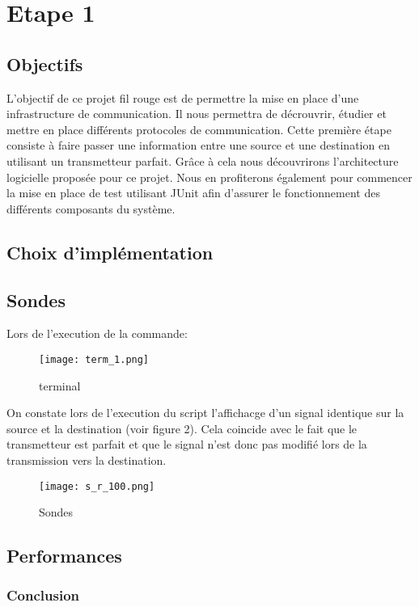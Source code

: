 \section{Etape 1}
\subsection{Objectifs}

L'objectif de ce projet fil rouge est de permettre la mise en place d'une infrastructure de communication.
Il nous permettra de décrouvrir, étudier et mettre en place différents protocoles de communication. Cette première étape 
consiste à faire passer une information entre une source et une destination en utilisant
un transmetteur parfait. Grâce à cela nous découvrirons l'architecture logicielle proposée pour ce projet. Nous en profiterons également
pour commencer la mise en place de test utilisant JUnit afin d'assurer le fonctionnement des différents composants du système.

\subsection{Choix d'implémentation}

\pagebreak

\subsection{Sondes}

Lors de l'execution de la commande: 

\begin{figure}[h]
    \centering
    \texttt{[image: term\_1.png]}
    \caption{terminal}
\end{figure}

On constate lors de l'execution du script l'affichacge d'un signal identique sur la source et la destination (voir figure 2). Cela coincide 
avec le fait que le transmetteur est parfait et que le signal n'est donc pas modifié lors de la transmission vers la destination.

\begin{figure}[h]
    \centering
    \texttt{[image: s\_r\_100.png]}
    \caption{Sondes}
\end{figure}
\subsection{Performances}

\subsubsection{Conclusion}
    
    

